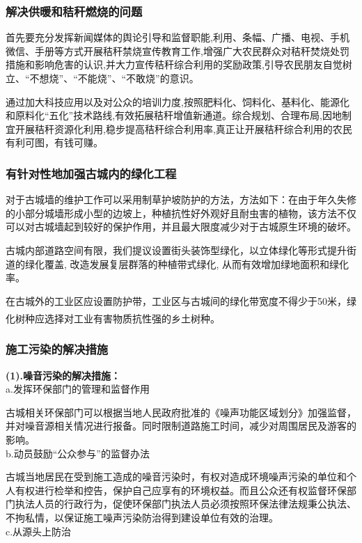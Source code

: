 \documentclass[UTF8]{ctexart}
\newcommand{\upcite}[1]{\textsuperscript{\textsuperscript{\cite{#1}}}}
\begin{document}
        \subsubsection{解决供暖和秸秆燃烧的问题}
        首先要充分发挥新闻媒体的舆论引导和监督职能,利用、条幅、广播、电视、手机微信、手册等方式开展秸秆禁烧宣传教育工作,增强广大农民群众对秸秆焚烧处罚措施和影响危害的认识,并大力宣传秸秆综合利用的奖励政策,引导农民朋友自觉树立、“不想烧”、“不能烧”、“不敢烧”的意识。

        通过加大科技应用以及对公众的培训力度,按照肥料化、饲料化、基料化、能源化和原料化“五化”技术路线,有效拓展秸秆增值新通道。综合规划、合理布局,因地制宜开展秸秆资源化利用,稳步提高秸秆综合利用率,真正让开展秸秆综合利用的农民有利可图，有钱可赚。
        \subsubsection{有针对性地加强古城内的绿化工程}
        对于古城墙的维护工作可以采用制草护坡防护的方法，方法如下：在由于年久失修的小部分城墙形成小型的边坡上，种植抗性好外观好且耐虫害的植物，该方法不仅可以对古城墙起到较好的保护作用，并且最大限度减少对于古城原生环境的破坏。

        古城内部道路空间有限，我们提议设置街头装饰型绿化，以立体绿化等形式提升街道的绿化覆盖, 改造发展复层群落的种植带式绿化, 从而有效增加绿地面积和绿化率。
        
        在古城外的工业区应设置防护带，工业区与古城间的绿化带宽度不得少于50米，绿化树种应选择对工业有害物质抗性强的乡土树种。\upcite{赵阔宇2011浅谈边坡生态防护技术在古城墙保护中绿化的应用}
        \subsubsection{施工污染的解决措施}
\textbf{(1).噪音污染的解决措施：}\\
a.发挥环保部门的管理和监督作用

古城相关环保部门可以根据当地人民政府批准的《噪声功能区域划分》加强监督，并对噪音源相关情况进行报备。同时限制道路施工时间，减少对周围居民及游客的影响。\\
b.动员鼓励“公众参与”的监督办法

古城当地居民在受到施工造成的噪音污染时，有权对造成环境噪声污染的单位和个人有权进行检举和控告，保护自己应享有的环境权益。而且公众还有权监督环保部门执法人员的行政行为，促使环保部门执法人员必须按照环保法律法规秉公执法、不拘私情，以保证施工噪声污染防治得到建设单位有效的治理。\\
c.从源头上防治
\end{document}
